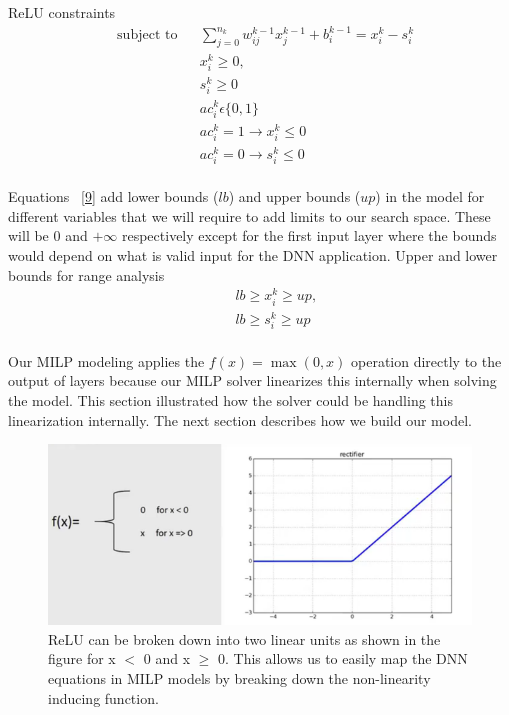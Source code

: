 ReLU constraints
\begin{equation}
\label{8}
\begin{aligned}
& \text{subject to} & &  \sum_{j=0}^{n_k} w_{ij}^{k-1}x_{j}^{k-1} + b_i^{k-1} = x_i^k - s_i^k  \\
& & & x_i^k \geq 0, \\
& & & s_i^k \geq 0 \\
& & & ac_i^k  \epsilon  \{0,1\} \\
& & & ac_i^k  =  1 \rightarrow  x_i^k \leq 0  \\
& & & ac_i^k =  0 \rightarrow s_i^k  \leq 0   \\
\end{aligned}
\end{equation}

Equations ~\ref{9} add lower bounds ($lb$) and upper bounds ($up$) in the  model for different variables that we will  require to add limits to our search space.  
These will be 0 and $+\infty$ respectively except for the first input layer
where the bounds would depend on what is valid input for the DNN application.
Upper and lower bounds for range analysis
\begin{equation}
\label{9}
\begin{aligned}
& & & lb \geq x_i^k \geq up, \\
& & &  lb \geq s_i^k \geq up \\
\end{aligned}
\end{equation}








Our MILP modeling applies the $f(x) = \max(0, x)$ operation directly to the output of layers because our MILP solver linearizes this internally when solving the model.
This section illustrated how the solver could be handling this linearization internally. The next section describes how we build our model.




\begin{figure}
	\centering
	\includegraphics[width=0.7\linewidth]{Images/ReLUbreakdown}
	\caption{ReLU can be broken down into two linear units as shown in the figure for x $<$ 0 and x $\geq$ 0. This allows us to easily map the DNN equations in MILP models by breaking down the non-linearity inducing function.}
	\label{fig:relubreakdown}
\end{figure}

